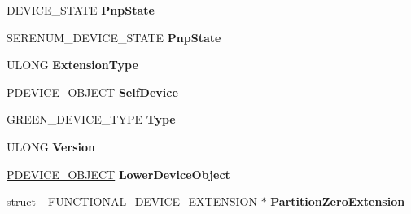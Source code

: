 \begin{DoxyCompactItemize}
\item 
\mbox{\label{struct___c_o_m_m_o_n___d_e_v_i_c_e___e_x_t_e_n_s_i_o_n_a2535bba1ccd9375f65d2dd6d1110a7f4}} 
D\+E\+V\+I\+C\+E\+\_\+\+S\+T\+A\+TE {\bfseries Pnp\+State}
\item 
\mbox{\label{struct___c_o_m_m_o_n___d_e_v_i_c_e___e_x_t_e_n_s_i_o_n_ad31a848c41e95422b9384256092e6ced}} 
S\+E\+R\+E\+N\+U\+M\+\_\+\+D\+E\+V\+I\+C\+E\+\_\+\+S\+T\+A\+TE {\bfseries Pnp\+State}
\item 
\mbox{\label{struct___c_o_m_m_o_n___d_e_v_i_c_e___e_x_t_e_n_s_i_o_n_aaf0326ad38b8762100b4f06ca699def0}} 
U\+L\+O\+NG {\bfseries Extension\+Type}
\item 
\mbox{\label{struct___c_o_m_m_o_n___d_e_v_i_c_e___e_x_t_e_n_s_i_o_n_a761747a7b57a2255eb46cb0b8674649f}} 
\hyperlink{struct___d_e_v_i_c_e___o_b_j_e_c_t}{P\+D\+E\+V\+I\+C\+E\+\_\+\+O\+B\+J\+E\+CT} {\bfseries Self\+Device}
\item 
\mbox{\label{struct___c_o_m_m_o_n___d_e_v_i_c_e___e_x_t_e_n_s_i_o_n_a03d18a10d5d67941c626bd1629dbc340}} 
G\+R\+E\+E\+N\+\_\+\+D\+E\+V\+I\+C\+E\+\_\+\+T\+Y\+PE {\bfseries Type}
\item 
\mbox{\label{struct___c_o_m_m_o_n___d_e_v_i_c_e___e_x_t_e_n_s_i_o_n_a2e1be364356df61a5755f8372aaf5648}} 
U\+L\+O\+NG {\bfseries Version}
\item 
\mbox{\label{struct___c_o_m_m_o_n___d_e_v_i_c_e___e_x_t_e_n_s_i_o_n_a7dc11fff83463bd170c85d0d12c81f2d}} 
\hyperlink{struct___d_e_v_i_c_e___o_b_j_e_c_t}{P\+D\+E\+V\+I\+C\+E\+\_\+\+O\+B\+J\+E\+CT} {\bfseries Lower\+Device\+Object}
\item 
\mbox{\label{struct___c_o_m_m_o_n___d_e_v_i_c_e___e_x_t_e_n_s_i_o_n_ab671915d3c4236d57e4a69b4d694d521}} 
\hyperlink{interfacestruct}{struct} \hyperlink{struct___f_u_n_c_t_i_o_n_a_l___d_e_v_i_c_e___e_x_t_e_n_s_i_o_n}{\+\_\+\+F\+U\+N\+C\+T\+I\+O\+N\+A\+L\+\_\+\+D\+E\+V\+I\+C\+E\+\_\+\+E\+X\+T\+E\+N\+S\+I\+ON} $\ast$ {\bfseries Partition\+Zero\+Extension}

\end{DoxyCompactItemize}
